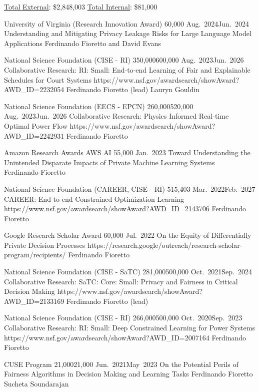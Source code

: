 
\begin{keywords}
{\underline{Total External}: \$2,848,003 %
\hspace{8pt} \underline{Total Internal}: \$81,000}%
\end{keywords}


\begin{projects}
	\grantentrySinglePI
	{University of Virginia (Research Innovation Award)}
	{60,000}
	{Aug.~2024}{Jun.~2024}
	{Understanding and Mitigating Privacy Leakage Risks for Large Language Model Applications}
	{}
	{Ferdinando Fioretto and David Evans}

	\grantentrycoPI
	{National Science Foundation (CISE - RI)}
	{350,000}{600,000}
	{Aug.~2023}{Jun.~2026}
	{Collaborative Research: RI: Small: End-to-end Learning of Fair and Explainable Schedules for Court Systems}
	{https://www.nsf.gov/awardsearch/showAward?AWD_ID=2232054}
	{Ferdinando Fioretto (lead)}
	{Lauryn Gouldin}

	\grantentryPI
	{National Science Foundation (EECS - EPCN)}
	{260,000}{520,000}
	{Aug.~2023}{Jun.~2026}
	{Collaborative Research: Physics Informed Real-time Optimal Power Flow}
	{https://www.nsf.gov/awardsearch/showAward?AWD_ID=2242931}
	{Ferdinando Fioretto}

	\grantentrySinglePI
	{Amazon Research Awards AWS AI}
	{55,000}
	{Jan.~2023}{}
	{Toward Understanding the Unintended Disparate Impacts of  Private Machine Learning Systems}
	{~}
	{Ferdinando Fioretto}

	\grantentrySinglePI
	{National Science Foundation (CAREER, CISE - RI)}
	{515,403}
	{Mar.~2022}{Feb.~2027}
	{CAREER: End-to-end Constrained Optimization Learning}
	{https://www.nsf.gov/awardsearch/showAward?AWD_ID=2143706}
	{Ferdinando Fioretto}
	
	\grantentrySinglePI
	{Google Research Scholar Award}
	{60,000}
	{Jul.~2022}{}
	{On the Equity of Differentially Private Decision Processes}
	{https://research.google/outreach/research-scholar-program/recipients/}
	{Ferdinando Fioretto}

	\grantentryPI
	{National Science Foundation (CISE - SaTC)}
	{281,000}{500,000}
	{Oct.~2021}{Sep.~2024}
	{Collaborative Research: SaTC: Core: Small: Privacy and Fairness in Critical Decision Making}
	{https://www.nsf.gov/awardsearch/showAward?AWD_ID=2133169}
	{Ferdinando Fioretto (lead)}

\end{projects}
\begin{projects}

	\grantentryPI
	{National Science Foundation (CISE - RI)}
	{266,000}{500,000}
	{Oct.~2020}{Sep.~2023}
	{Collaborative Research: RI: Small: Deep Constrained Learning for Power Systems}
	{https://www.nsf.gov/awardsearch/showAward?AWD_ID=2007164}
	{Ferdinando Fioretto}

\grantentrycoPI
	{CUSE Program}
	{21,000}{21,000}
	{Jun.~2021}{May~2023}
	{On the Potential Perils of Fairness Algorithms in Decision Making and Learning Tasks}
	{}
	{Ferdinando Fioretto}
	{Sucheta Soundarajan}
\end{projects}

